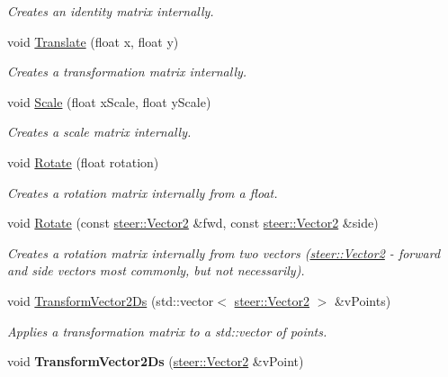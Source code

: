 \begin{DoxyCompactItemize}
\begin{DoxyCompactList}\small\item\em Creates an identity matrix internally. \end{DoxyCompactList}\item 
void \hyperlink{classsteer_1_1_matrix2_d_a266bf2bf7fe0dc313aee5c4a6ec0b12e}{Translate} (float x, float y)
\begin{DoxyCompactList}\small\item\em Creates a transformation matrix internally. \end{DoxyCompactList}\item 
void \hyperlink{classsteer_1_1_matrix2_d_a9cb0dd14362af4d892266022c058b49d}{Scale} (float x\-Scale, float y\-Scale)
\begin{DoxyCompactList}\small\item\em Creates a scale matrix internally. \end{DoxyCompactList}\item 
void \hyperlink{classsteer_1_1_matrix2_d_a7aa17d35b8094ff62f867c84816f7006}{Rotate} (float rotation)
\begin{DoxyCompactList}\small\item\em Creates a rotation matrix internally from a float. \end{DoxyCompactList}\item 
void \hyperlink{classsteer_1_1_matrix2_d_aa37d7c7a060ed5504d3379b78f5b66be}{Rotate} (const \hyperlink{structsteer_1_1_vector2}{steer\-::\-Vector2} \&fwd, const \hyperlink{structsteer_1_1_vector2}{steer\-::\-Vector2} \&side)
\begin{DoxyCompactList}\small\item\em Creates a rotation matrix internally from two vectors (\hyperlink{structsteer_1_1_vector2}{steer\-::\-Vector2} -\/ forward and side vectors most commonly, but not necessarily). \end{DoxyCompactList}\item 
void \hyperlink{classsteer_1_1_matrix2_d_a4dc0b8466b0302cbb9edf38bc89b7f84}{Transform\-Vector2\-Ds} (std\-::vector$<$ \hyperlink{structsteer_1_1_vector2}{steer\-::\-Vector2} $>$ \&v\-Points)
\begin{DoxyCompactList}\small\item\em Applies a transformation matrix to a std\-::vector of points. \end{DoxyCompactList}\item 
\hypertarget{classsteer_1_1_matrix2_d_a7ae953d3782f301e48d02422f4a806e0}{void {\bfseries Transform\-Vector2\-Ds} (\hyperlink{structsteer_1_1_vector2}{steer\-::\-Vector2} \&v\-Point)}\label{classsteer_1_1_matrix2_d_a7ae953d3782f301e48d02422f4a806e0}


\end{DoxyCompactItemize}

